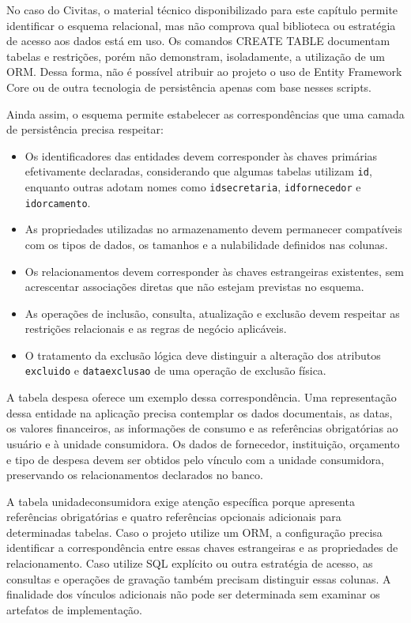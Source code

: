 No caso do Civitas, o material técnico disponibilizado para este capítulo permite identificar o esquema relacional, mas não comprova qual biblioteca ou estratégia de acesso aos dados está em uso. Os comandos CREATE TABLE documentam tabelas e restrições, porém não demonstram, isoladamente, a utilização de um ORM. Dessa forma, não é possível atribuir ao projeto o uso de Entity Framework Core ou de outra tecnologia de persistência apenas com base nesses scripts.

Ainda assim, o esquema permite estabelecer as correspondências que uma camada de persistência precisa respeitar:
\begin{itemize}
\item Os identificadores das entidades devem corresponder às chaves primárias efetivamente declaradas, considerando que algumas tabelas utilizam \texttt{id}, enquanto outras adotam nomes como \texttt{idsecretaria}, \texttt{idfornecedor} e \texttt{idorcamento}.
\item As propriedades utilizadas no armazenamento devem permanecer compatíveis com os tipos de dados, os tamanhos e a nulabilidade definidos nas colunas.
\item Os relacionamentos devem corresponder às chaves estrangeiras existentes, sem acrescentar associações diretas que não estejam previstas no esquema.
\item As operações de inclusão, consulta, atualização e exclusão devem respeitar as restrições relacionais e as regras de negócio aplicáveis.
\item O tratamento da exclusão lógica deve distinguir a alteração dos atributos \texttt{excluido} e \texttt{dataexclusao} de uma operação de exclusão física.
\end{itemize}

A tabela despesa oferece um exemplo dessa correspondência. Uma representação dessa entidade na aplicação precisa contemplar os dados documentais, as datas, os valores financeiros, as informações de consumo e as referências obrigatórias ao usuário e à unidade consumidora. Os dados de fornecedor, instituição, orçamento e tipo de despesa devem ser obtidos pelo vínculo com a unidade consumidora, preservando os relacionamentos declarados no banco.

A tabela unidadeconsumidora exige atenção específica porque apresenta referências obrigatórias e quatro referências opcionais adicionais para determinadas tabelas. Caso o projeto utilize um ORM, a configuração precisa identificar a correspondência entre essas chaves estrangeiras e as propriedades de relacionamento. Caso utilize SQL explícito ou outra estratégia de acesso, as consultas e operações de gravação também precisam distinguir essas colunas. A finalidade dos vínculos adicionais não pode ser determinada sem examinar os artefatos de implementação.

